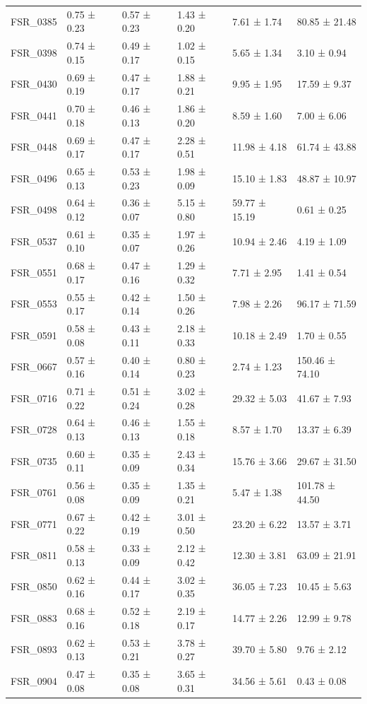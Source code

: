 \begin{tabular}{llllll}
FSR_0385 & 0.75 ± 0.23 & 0.57 ± 0.23 & 1.43 ± 0.20 & 7.61 ± 1.74 & 80.85 ± 21.48 \\
FSR_0398 & 0.74 ± 0.15 & 0.49 ± 0.17 & 1.02 ± 0.15 & 5.65 ± 1.34 & 3.10 ± 0.94 \\
FSR_0430 & 0.69 ± 0.19 & 0.47 ± 0.17 & 1.88 ± 0.21 & 9.95 ± 1.95 & 17.59 ± 9.37 \\
FSR_0441 & 0.70 ± 0.18 & 0.46 ± 0.13 & 1.86 ± 0.20 & 8.59 ± 1.60 & 7.00 ± 6.06 \\
FSR_0448 & 0.69 ± 0.17 & 0.47 ± 0.17 & 2.28 ± 0.51 & 11.98 ± 4.18 & 61.74 ± 43.88 \\
FSR_0496 & 0.65 ± 0.13 & 0.53 ± 0.23 & 1.98 ± 0.09 & 15.10 ± 1.83 & 48.87 ± 10.97 \\
FSR_0498 & 0.64 ± 0.12 & 0.36 ± 0.07 & 5.15 ± 0.80 & 59.77 ± 15.19 & 0.61 ± 0.25 \\
FSR_0537 & 0.61 ± 0.10 & 0.35 ± 0.07 & 1.97 ± 0.26 & 10.94 ± 2.46 & 4.19 ± 1.09 \\
FSR_0551 & 0.68 ± 0.17 & 0.47 ± 0.16 & 1.29 ± 0.32 & 7.71 ± 2.95 & 1.41 ± 0.54 \\
FSR_0553 & 0.55 ± 0.17 & 0.42 ± 0.14 & 1.50 ± 0.26 & 7.98 ± 2.26 & 96.17 ± 71.59 \\
FSR_0591 & 0.58 ± 0.08 & 0.43 ± 0.11 & 2.18 ± 0.33 & 10.18 ± 2.49 & 1.70 ± 0.55 \\
FSR_0667 & 0.57 ± 0.16 & 0.40 ± 0.14 & 0.80 ± 0.23 & 2.74 ± 1.23 & 150.46 ± 74.10 \\
FSR_0716 & 0.71 ± 0.22 & 0.51 ± 0.24 & 3.02 ± 0.28 & 29.32 ± 5.03 & 41.67 ± 7.93 \\
FSR_0728 & 0.64 ± 0.13 & 0.46 ± 0.13 & 1.55 ± 0.18 & 8.57 ± 1.70 & 13.37 ± 6.39 \\
FSR_0735 & 0.60 ± 0.11 & 0.35 ± 0.09 & 2.43 ± 0.34 & 15.76 ± 3.66 & 29.67 ± 31.50 \\
FSR_0761 & 0.56 ± 0.08 & 0.35 ± 0.09 & 1.35 ± 0.21 & 5.47 ± 1.38 & 101.78 ± 44.50 \\
FSR_0771 & 0.67 ± 0.22 & 0.42 ± 0.19 & 3.01 ± 0.50 & 23.20 ± 6.22 & 13.57 ± 3.71 \\
FSR_0811 & 0.58 ± 0.13 & 0.33 ± 0.09 & 2.12 ± 0.42 & 12.30 ± 3.81 & 63.09 ± 21.91 \\
FSR_0850 & 0.62 ± 0.16 & 0.44 ± 0.17 & 3.02 ± 0.35 & 36.05 ± 7.23 & 10.45 ± 5.63 \\
FSR_0883 & 0.68 ± 0.16 & 0.52 ± 0.18 & 2.19 ± 0.17 & 14.77 ± 2.26 & 12.99 ± 9.78 \\
FSR_0893 & 0.62 ± 0.13 & 0.53 ± 0.21 & 3.78 ± 0.27 & 39.70 ± 5.80 & 9.76 ± 2.12 \\
FSR_0904 & 0.47 ± 0.08 & 0.35 ± 0.08 & 3.65 ± 0.31 & 34.56 ± 5.61 & 0.43 ± 0.08 \\

\end{tabular}
